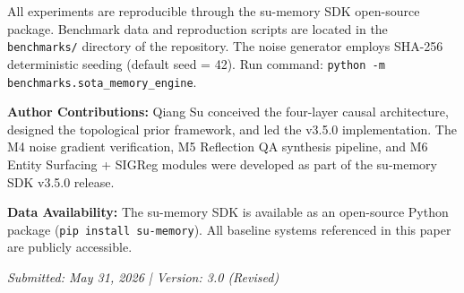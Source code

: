 \documentclass[11pt,a4paper]{article}
\begin{document}
All experiments are reproducible through the su-memory SDK open-source package. Benchmark data and reproduction scripts are located in the \texttt{benchmarks/} directory of the repository. The noise generator employs SHA-256 deterministic seeding (default seed = 42). Run command: \texttt{python -m benchmarks.sota\_memory\_engine}.

\vspace{10pt}
\noindent\textbf{Author Contributions:} Qiang Su conceived the four-layer causal architecture, designed the topological prior framework, and led the v3.5.0 implementation. The M4 noise gradient verification, M5 Reflection QA synthesis pipeline, and M6 Entity Surfacing + SIGReg modules were developed as part of the su-memory SDK v3.5.0 release.

\noindent\textbf{Data Availability:} The su-memory SDK is available as an open-source Python package (\texttt{pip install su-memory}). All baseline systems referenced in this paper are publicly accessible.

\vspace{10pt}
\begin{center}
\textit{Submitted: May 31, 2026 \quad | \quad Version: 3.0 (Revised)}
\end{center}
\end{document}
